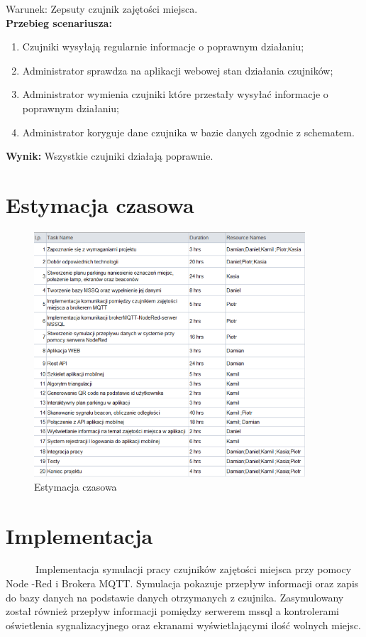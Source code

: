 \documentclass[12pt,a4paper]{article}
\begin{document}
Warunek: Zepsuty czujnik zajętości miejsca.
\\{\bf Przebieg scenariusza:}
\begin{enumerate}
\item Czujniki wysyłają regularnie informacje o poprawnym działaniu;
\item Administrator sprawdza na aplikacji webowej stan działania czujników;
\item Administrator wymienia czujniki które przestały wysyłać informacje o poprawnym działaniu;
\item Administrator koryguje dane czujnika w bazie danych zgodnie z schematem.
\end{enumerate}
{\bf Wynik:} Wszystkie czujniki działają poprawnie.



\newpage

\section{Estymacja czasowa}
\begin{figure}[htb!p]
\begin{center}
\includegraphics[width=0.9\textwidth]{unknown2.png}
\caption{Estymacja czasowa}
\end{center}
\end{figure}

\section{Implementacja}
\ \ \ \ \ \ Implementacja  symulacji pracy czujników zajętości miejsca przy pomocy Node -Red i Brokera MQTT. Symulacja  pokazuje przepływ informacji oraz zapis do bazy danych na podstawie danych otrzymanych z czujnika. Zasymulowany został również  przepływ informacji pomiędzy  serwerem mssql a kontrolerami oświetlenia sygnalizacyjnego oraz ekranami wyświetlającymi ilość wolnych miejsc.
\end{document}

